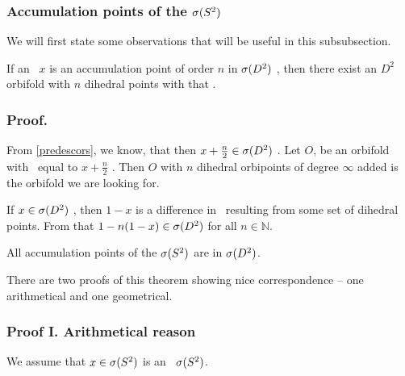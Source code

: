 
\subsubsection{Accumulation points of the ${{\sigma}(S^2)}$}
We will first state some observations that will be useful in this subsubsection.
\begin{observation}
If an \Eoc\ $x$ is an accumulation point of order $n$ in ${{\sigma}(D^2)}$ , 
then there exist an $D^2$  
orbifold with $n$ dihedral  points with that \Eoc. 
\end{observation}
\subsubsection{Proof.}
From \ref{predescors}, we know, that then $x + \frac{n}{2} \in {{\sigma}(D^2)}$ 
. 
Let $O$, be an orbifold with \Eoc\ equal to $x+\frac{n}{2}$ . 
Then $O$ with $n$ dihedral  orbipoints of degree $\infty$ 
added is the orbifold we are looking for.  
\begin{observation}\label{adding_multiplied_differences}
If $x \in {{\sigma}(D^2)}$ , then $1-x$  is 
a difference in 
\Eoc\ resulting 
from some set of dihedral  points. From that $1-n(1-x) \in {{\sigma}(D^2)}$ 
for all $n \in \mathbb{N}$. 
\end{observation}
\begin{theorem}
All accumulation points of the ${{\sigma}(S^2)}$ are in ${{\sigma}(D^2)}$.
\end{theorem}
There are two proofs of this theorem showing nice correspondence -- one arithmetical and 
one geometrical. 
\subsubsection{Proof I. Arithmetical reason}
We assume that $x \in {{\sigma}(S^2)}$ is an \apots\ ${{\sigma}(S^2)}$.

